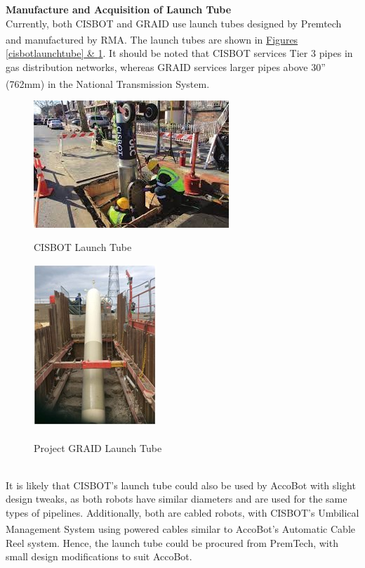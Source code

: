\documentclass[11pt]{article}		%
\newlength{\imageheight}	 %
\newcommand{\supercite}[1]{\textsuperscript{\cite{#1}}}		%
\begin{document}
            \textbf{Manufacture and Acquisition of Launch Tube}
            \\
            Currently, both CISBOT and GRAID use launch tubes designed by Premtech and manufactured by RMA\supercite{launchtubemfg}. The launch tubes are shown in \hyperref[cisbotlaunchtube]{Figures \ref*{cisbotlaunchtube} \& \ref*{graidlaunchtube}}. It should be noted that CISBOT services Tier 3 pipes in gas distribution networks, whereas GRAID services larger pipes above 30” (762mm) in the National Transmission System\supercite{GRAID}.
		\begin{figure}[h]
				\centering
				\begin{multicols}{2}
				    \includegraphics[height = 0.8\imageheight]{CISBOTlaunchtube.jpg}
    				\caption{CISBOT Launch Tube \cite{CISBOT_project}}
    				\label{cisbotlaunchtube}
    				\columnbreak
    				\includegraphics[height = 0.8\imageheight]{GRAIDlaunchtube.jpg}
    				\caption{Project GRAID Launch Tube\supercite{GRAID}}
    				\label{graidlaunchtube}
				\end{multicols}
			\end{figure}
			\\
            \hspace*{2ex}It is likely that CISBOT’s launch tube could also be used by AccoBot with slight design tweaks, as both robots have similar diameters and are used for the same types of pipelines. Additionally, both are cabled robots, with CISBOT’s Umbilical Management System using powered cables\supercite{CISBOTUMS} similar to AccoBot's Automatic Cable Reel system. Hence, the launch tube could be procured from PremTech, with small design modifications to suit AccoBot.
            
\end{document}
